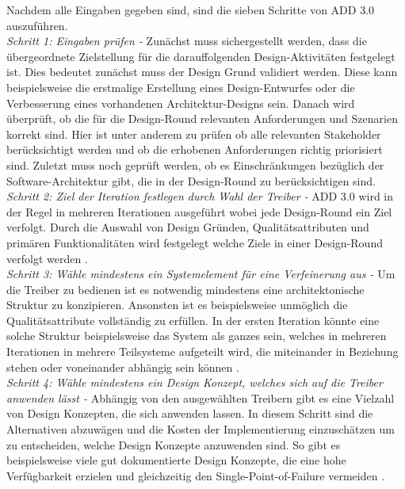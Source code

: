 Nachdem alle Eingaben gegeben sind, sind die sieben Schritte von ADD 3.0 auszuf\"uhren.\\

\emph{Schritt 1: Eingaben pr\"ufen -}
Zun\"achst muss sichergestellt werden, dass die \"ubergeordnete Zielstellung f\"ur die darauffolgenden Design-Aktivit\"aten festgelegt ist. Dies bedeutet zun\"achst muss der Design Grund validiert werden. Diese kann beispielsweise die erstmalige Erstellung eines Design-Entwurfes oder die Verbesserung eines vorhandenen Architektur-Designs sein. Danach wird \"uberpr\"uft, ob die f\"ur die Design-Round relevanten Anforderungen und Szenarien korrekt sind. Hier ist unter anderem zu pr\"ufen ob alle relevanten Stakeholder ber\"ucksichtigt werden und ob die erhobenen Anforderungen richtig priorisiert sind. Zuletzt muss noch gepr\"uft werden, ob es Einschr\"ankungen bez\"uglich der Software-Architektur gibt, die in der Design-Round zu ber\"ucksichtigen sind.\\

\emph{Schritt 2: Ziel der Iteration festlegen durch Wahl der Treiber -}
ADD 3.0 wird in der Regel in mehreren Iterationen ausgef\"uhrt wobei jede Design-Round ein Ziel verfolgt. Durch die Auswahl von Design Gr\"unden, Qualit\"atsattributen und prim\"aren Funktionalit\"aten wird festgelegt welche Ziele in einer Design-Round verfolgt werden \cite{Cer01}.\\

\emph{Schritt 3: W\"ahle mindestens ein Systemelement f\"ur eine Verfeinerung aus -}
Um die Treiber zu bedienen ist es notwendig mindestens eine architektonische Struktur zu konzipieren. Ansonsten ist es beispielsweise unm\"oglich die Qualit\"atsattribute vollst\"andig zu erf\"ullen. In der ersten Iteration k\"onnte eine solche Struktur beispielsweise das System als ganzes sein, welches in mehreren Iterationen in mehrere Teilsysteme aufgeteilt wird, die miteinander in Beziehung stehen oder voneinander abh\"angig sein k\"onnen \cite{Cer01}.\\

\emph{Schritt 4: W\"ahle mindestens ein Design Konzept, welches sich auf die Treiber anwenden l\"asst -}
Abh\"angig von den ausgew\"ahlten Treibern gibt es eine Vielzahl von Design Konzepten, die sich anwenden lassen. In diesem Schritt sind die Alternativen abzuw\"agen und die Kosten der Implementierung einzusch\"atzen um zu entscheiden, welche Design Konzepte anzuwenden sind. So gibt es beispielsweise viele gut dokumentierte Design Konzepte, die eine hohe Verf\"ugbarkeit erzielen und gleichzeitig den Single-Point-of-Failure vermeiden \cite{Cer01}.\\

